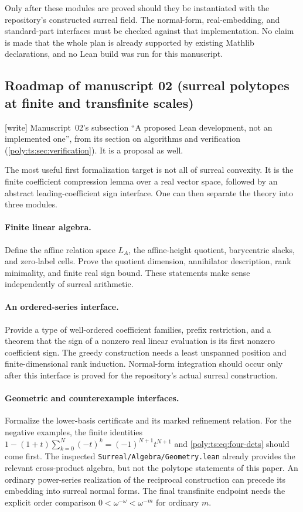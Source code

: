 \documentclass[11pt,a4paper]{article}
\numberwithin{equation}{section}
\theoremstyle{plain}
\newcommand{\wtag}{\textup{[write]}}%
\begin{document}
Only after these modules are proved should they be instantiated with the
repository's constructed surreal field. The normal-form, real-embedding,
and standard-part interfaces must be checked against that implementation.
No claim is made that the whole plan is already supported by existing
Mathlib declarations, and no Lean build was run for this manuscript.
\subsection{Roadmap of manuscript 02 (surreal polytopes at finite and transfinite scales)}\label{poly:ts:sec:leanplan}
\noindent\wtag{} Manuscript~02's subsection ``A proposed Lean development, not an implemented one'', from its section on algorithms and verification (\cref{poly:ts:sec:verification}). It is a proposal as well.

The most useful first formalization target is not all of surreal convexity.
It is the finite coefficient compression lemma over a real vector space,
followed by an abstract leading-coefficient sign interface. One can then
separate the theory into three modules.

\paragraph{Finite linear algebra.}
Define the affine relation space $L_A$, the affine-height quotient,
barycentric slacks, and zero-label cells. Prove the quotient dimension,
annihilator description, rank minimality, and finite real sign bound.
These statements make sense independently of surreal arithmetic.

\paragraph{An ordered-series interface.}
Provide a type of well-ordered coefficient families, prefix restriction,
and a theorem that the sign of a nonzero real linear evaluation is its
first nonzero coefficient sign. The greedy construction needs a least
unspanned position and finite-dimensional rank induction. Normal-form
integration should occur only after this interface is proved for the
repository's actual surreal construction.

\paragraph{Geometric and counterexample interfaces.}
Formalize the lower-basis certificate and its marked refinement relation.
For the negative examples, the finite identities
$1-(1+t)\sum_{k=0}^N(-t)^k=(-1)^{N+1}t^{N+1}$ and
\eqref{poly:ts:eq:four-dets} should come first. The inspected
\texttt{Surreal/Algebra/Geometry.lean} already provides the relevant
cross-product algebra, but not the polytope statements of this paper.
An ordinary power-series realization of the reciprocal construction can
precede its embedding into surreal normal forms. The final transfinite
endpoint needs the explicit order comparison
$0<\omega^{-\omega}<\omega^{-m}$ for ordinary $m$.
\end{document}
